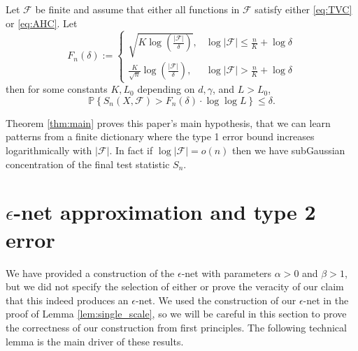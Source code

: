 \begin{theorem}
\label{thm:main}
Let $\mathcal F$ be finite and assume that either all functions in $\mathcal F$ satisfy either \eqref{eq:TVC} or \eqref{eq:AHC}.
Let
\begin{equation}
    F_n(\delta) := \left\{ \begin{array}{ll}
    \sqrt{K \log\left( \frac{|\mathcal F|}{\delta} \right)}, &\log |\mathcal F| \le \frac nK + \log \delta\\
    \frac{K}{\sqrt n} \log \left( \frac{|\mathcal{F}|}{\delta} \right), &\log |\mathcal F| > \frac nK + \log \delta
    \end{array}\right.
\end{equation}
then for some constants $K, L_0$ depending on $d,\gamma$, and $L > L_0$,
\begin{equation}
    \mathbb P\left\{ S_n(X,\mathcal F) > F_n(\delta) \cdot \log \log L \right\} \le \delta.
\end{equation}
\end{theorem}

Theorem \ref{thm:main} proves this paper's main hypothesis, that we can learn patterns from a finite dictionary where the type 1 error bound increases logarithmically with $|\mathcal F|$.
In fact if $\log |\mathcal F| = o(n)$ then we have subGaussian concentration of the final test statistic $S_n$.

\section{$\epsilon$-net approximation and type 2 error}
\label{sec:eps}

We have provided a construction of the $\epsilon$-net with parameters $\alpha> 0$ and $\beta > 1$, but we did not specify the selection of either or prove the veracity of our claim that this indeed produces an $\epsilon$-net.
We used the construction of our $\epsilon$-net in the proof of Lemma \ref{lem:single_scale}, so we will be careful in this section to prove the correctness of our construction from first principles.
The following technical lemma is the main driver of these results.

